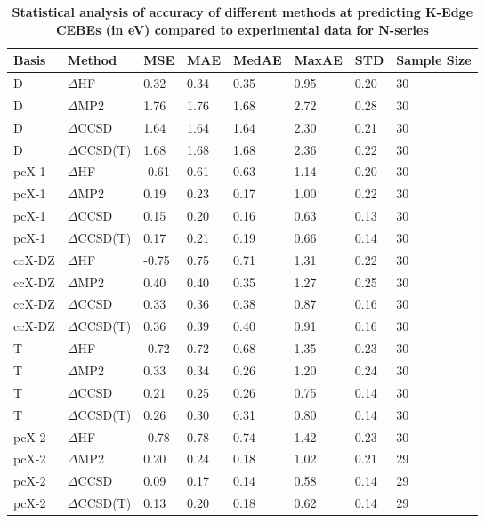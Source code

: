 \begin{table}
  \caption{\textbf{Statistical analysis of accuracy of different methods at predicting K-Edge CEBEs (in eV) compared to experimental data for N-series}}
  \label{tbl:method-summary-n}
  \begin{tabular}{l l l l l l l l }
    \toprule
    \textbf{Basis} & \textbf{Method} & \textbf{MSE} & \textbf{MAE} & \textbf{MedAE} & \textbf{MaxAE} & \textbf{STD} & \textbf{Sample Size} \\ 
    \midrule
    D & $\Delta$HF & 0.32 & 0.34 & 0.35 & 0.95 & 0.20 & 30 \\ 
    D & $\Delta$MP2 & 1.76 & 1.76 & 1.68 & 2.72 & 0.28 & 30 \\ 
    D & $\Delta$CCSD & 1.64 & 1.64 & 1.64 & 2.30 & 0.21 & 30 \\ 
    D & $\Delta$CCSD(T) & 1.68 & 1.68 & 1.68 & 2.36 & 0.22 & 30 \\ 
    pcX-1 & $\Delta$HF & -0.61 & 0.61 & 0.63 & 1.14 & 0.20 & 30 \\ 
    pcX-1 & $\Delta$MP2 & 0.19 & 0.23 & 0.17 & 1.00 & 0.22 & 30 \\ 
    pcX-1 & $\Delta$CCSD & 0.15 & 0.20 & 0.16 & 0.63 & 0.13 & 30 \\ 
    pcX-1 & $\Delta$CCSD(T) & 0.17 & 0.21 & 0.19 & 0.66 & 0.14 & 30 \\ 
    ccX-DZ & $\Delta$HF & -0.75 & 0.75 & 0.71 & 1.31 & 0.22 & 30 \\ 
    ccX-DZ & $\Delta$MP2 & 0.40 & 0.40 & 0.35 & 1.27 & 0.25 & 30 \\ 
    ccX-DZ & $\Delta$CCSD & 0.33 & 0.36 & 0.38 & 0.87 & 0.16 & 30 \\ 
    ccX-DZ & $\Delta$CCSD(T) & 0.36 & 0.39 & 0.40 & 0.91 & 0.16 & 30 \\ 
    T & $\Delta$HF & -0.72 & 0.72 & 0.68 & 1.35 & 0.23 & 30 \\ 
    T & $\Delta$MP2 & 0.33 & 0.34 & 0.26 & 1.20 & 0.24 & 30 \\ 
    T & $\Delta$CCSD & 0.21 & 0.25 & 0.26 & 0.75 & 0.14 & 30 \\ 
    T & $\Delta$CCSD(T) & 0.26 & 0.30 & 0.31 & 0.80 & 0.14 & 30 \\ 
    pcX-2 & $\Delta$HF & -0.78 & 0.78 & 0.74 & 1.42 & 0.23 & 30 \\ 
    pcX-2 & $\Delta$MP2 & 0.20 & 0.24 & 0.18 & 1.02 & 0.21 & 29 \\ 
    pcX-2 & $\Delta$CCSD & 0.09 & 0.17 & 0.14 & 0.58 & 0.14 & 29 \\ 
    pcX-2 & $\Delta$CCSD(T) & 0.13 & 0.20 & 0.18 & 0.62 & 0.14 & 29 \\ 

\end{tabular}
\end{table}
